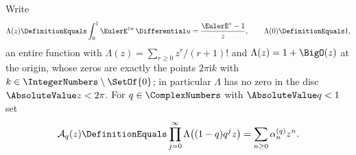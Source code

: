 \documentclass[11pt,a4paper,oneside,openany]{book}
\theoremstyle{definition}
\theoremstyle{remark}
\begin{document}
Write
\begin{equation}\label{eq:uniform-mgf-kernel}
 \Lambda(z)\DefinitionEquals\int_0^1\EulerE^{zu}\,\Differential u=\frac{\EulerE^z-1}{z},
 \qquad\Lambda(0)\DefinitionEquals1,
\end{equation}
an entire function with $\Lambda(z)=\sum_{r\ge0}z^r/(r+1)!$ and $\Lambda(z)=1+\BigO(z)$ at the
origin, whose zeros are exactly the points $2\pi\mathrm ik$ with $k\in\IntegerNumbers\setminus\SetOf{0}$; in
particular $\Lambda$ has no zero in the disc $\AbsoluteValue z<2\pi$.  For $q\in\ComplexNumbers$ with $\AbsoluteValue q<1$ set
\begin{equation}\label{eq:geometric-uniform-mgf-def}
 \mathcal A_q(z)\DefinitionEquals\prod_{j=0}^{\infty}\Lambda\bigl((1-q)q^jz\bigr)
 =\sum_{n\ge0}\alpha^{(q)}_nz^n .
\end{equation}
\end{document}
